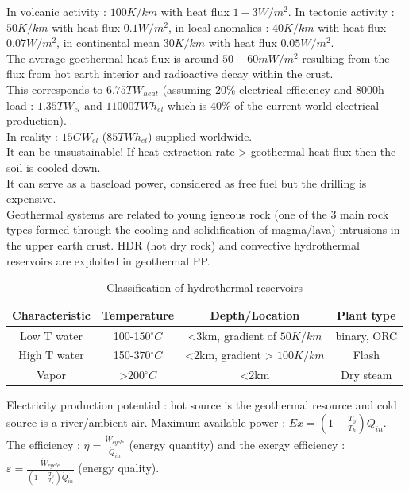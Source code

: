 \documentclass[../main.tex]{subfiles}
\begin{document}
In volcanic activity : $100K/km$ with heat flux $1-3W/m^2$. In tectonic activity : $50K/km$ with heat flux $0.1W/m^2$, in local anomalies : $40K/km$ with heat flux $0.07W/m^2$, in continental mean $30K/km$ with heat flux $0.05W/m^2$.\\

The average goethermal heat flux is around $50-60mW/m^2$ resulting from the flux from hot earth interior and radioactive decay within the crust.\\
This corresponds to $6.75TW_{heat}$ (assuming $20\%$ electrical efficiency and 8000h load : $1.35TW_{el}$ and $11000TWh_{el}$ which is $40\%$ of the current world electrical production).\\

In reality : $15GW_{el}$ ($85TWh_{el}$) supplied worldwide. \\

\warning It can be unsustainable! If heat extraction rate > geothermal heat flux then the soil is cooled down. \\
It can serve as a baseload power, considered as free fuel but the drilling is expensive. \\
Geothermal systems are related to young igneous rock (one of the 3 main rock types formed through the cooling and solidification of magma/lava) intrusions in the upper earth crust. HDR (hot dry rock) and convective hydrothermal reservoirs are exploited in geothermal PP.\\

\begin{table}[hbt!]
    \centering
    \begin{tabular}{c|c|c|c}
        Characteristic & Temperature & Depth/Location & Plant type \\ \hline
        Low T water & 100-150$^\circ C$ & <3km, gradient of $50K/km$ & binary, ORC\\
        High T water & 150-370$^\circ C$ & <2km, gradient > $100K/km$ & Flash \\
        Vapor & >$200^\circ C$ & <2km & Dry steam\\
    \end{tabular}
    \caption{Classification of hydrothermal reservoirs}
\end{table}

Electricity production potential : hot source is the geothermal resource and cold source is a river/ambient air. Maximum available power : $Ex = (1-\frac{T_0}{T_h})\dot{Q}_{in}$. The efficiency : $\eta = \frac{\dot{W}_{cycle}}{\dot{Q}_{in}}$ (energy quantity) and the exergy efficiency : $\varepsilon = \frac{\dot{W}_{cycle}}{(1-\frac{T_0}{T_h}) \dot{Q}_{in}}$ (energy quality).\\
\end{document}
